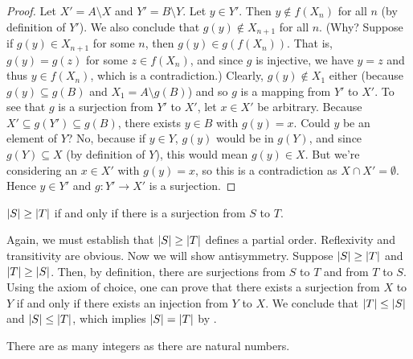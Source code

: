 \documentclass[11pt,twoside=off,numbers=noenddot]{scrbook}
\begin{document}
\begin{proof}
    Let $X' = A \setminus X$ and $Y' = B \setminus Y$. Let $y \in Y'$. Then $y \notin f(X_n)$ for all $n$ (by definition of $Y'$). We also conclude that $g(y) \notin X_{n + 1}$ for all $n$. (Why? Suppose if $g(y) \in X_{n + 1}$ for some $n$, then $g(y) \in g(f(X_n))$. That is, $g(y) = g(z)$ for some $z \in f(X_n)$, and since $g$ is injective, we have $y = z$ and thus $y \in f(X_n)$, which is a contradiction.) Clearly, $g(y) \notin X_1$ either (because $g(y) \subseteq g(B)$ and $X_1 = A \setminus g(B)$) and so $g$ is a mapping from $Y'$ to $X'$. To see that $g$ is a surjection from $Y'$ to $X'$, let $x \in X'$ be arbitrary. Because $X' \subseteq g(Y') \subseteq g(B)$, there exists $y \in B$ with $g(y) = x$. Could $y$ be an element of $Y$? No, because if $y \in Y$, $g(y)$ would be in $g(Y)$, and since $g(Y) \subseteq X$ (by definition of $Y$), this would mean $g(y) \in X$. But we're considering an $x \in X'$ with $g(y) = x$, so this is a contradiction as $X \cap X' = \emptyset$. Hence $y \in Y'$ and $g : Y' \to X'$ is a surjection.
\end{proof}

\begin{definition}
    $| S | \geq | T |$ if and only if there is a surjection from $S$ to $T$.
\end{definition}

\begin{remark}
    Again, we must establish that $| S | \geq | T |$ defines a partial order. Reflexivity and transitivity are obvious. Now we will show antisymmetry. Suppose $| S | \geq | T |$ and $| T | \geq | S |$. Then, by definition, there are surjections from $S$ to $T$ and from $T$ to $S$. Using the axiom of choice, one can prove that there exists a surjection from $X$ to $Y$ if and only if there exists an injection from $Y$ to $X$. We conclude that $| T | \leq | S |$ and $| S | \leq | T |$, which implies $| S | = | T |$ by .
\end{remark}

\begin{theorem}[$\abs{\ZZ} = \abs{\NN}$]
    There are as many integers as there are natural numbers.
\end{theorem}
\end{document}
